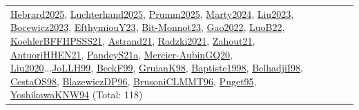 {\begin{longtable}{p{3cm}r>{\raggedright\arraybackslash}p{6cm}>{\raggedright\arraybackslash}p{6cm}>{\raggedright\arraybackslash}p{8cm}}
\hyperref[detail:Hebrard2025]{Hebrard2025}, \hyperref[detail:Luchterhand2025]{Luchterhand2025}, \hyperref[detail:Prumm2025]{Prumm2025}, \hyperref[detail:Marty2024]{Marty2024}, \hyperref[detail:Liu2023]{Liu2023}, \hyperref[detail:Bocewicz2023]{Bocewicz2023}, \hyperref[detail:EfthymiouY23]{EfthymiouY23}, \hyperref[detail:Bit-Monnot23]{Bit-Monnot23}, \hyperref[detail:Gao2022]{Gao2022}, \hyperref[detail:LuoB22]{LuoB22}, \hyperref[detail:KoehlerBFFHPSSS21]{KoehlerBFFHPSSS21}, \hyperref[detail:Astrand21]{Astrand21}, \hyperref[detail:Radzki2021]{Radzki2021}, \hyperref[detail:Zahout21]{Zahout21}, \hyperref[detail:AntuoriHHEN21]{AntuoriHHEN21}, \hyperref[detail:PandeyS21a]{PandeyS21a}, \hyperref[detail:Mercier-AubinGQ20]{Mercier-AubinGQ20}, \hyperref[detail:Liu2020]{Liu2020}...\hyperref[detail:JoLLH99]{JoLLH99}, \hyperref[detail:BeckF99]{BeckF99}, \hyperref[detail:GruianK98]{GruianK98}, \hyperref[detail:Baptiste1998]{Baptiste1998}, \hyperref[detail:BelhadjiI98]{BelhadjiI98}, \hyperref[detail:CestaOS98]{CestaOS98}, \hyperref[detail:BlazewiczDP96]{BlazewiczDP96}, \hyperref[detail:BrusoniCLMMT96]{BrusoniCLMMT96}, \hyperref[detail:Puget95]{Puget95}, \hyperref[detail:YoshikawaKNW94]{YoshikawaKNW94} (Total: 118)\\

\end{longtable}}
